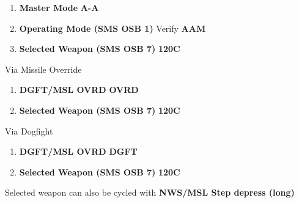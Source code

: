 \begin{tcoloritemize}
    \begin{enumerate}
        \item \textbf{Master Mode} \dotfill \textbf{A-A}
        \item \textbf{Operating Mode (SMS OSB 1)} \dotfill Verify \textbf{AAM}
        \item \textbf{Selected Weapon (SMS OSB 7)} \dotfill \textbf{120C}
    \end{enumerate}

    Via Missile Override

    \begin{enumerate}
        \item \textbf{DGFT/MSL OVRD} \dotfill \textbf{OVRD}
        \item \textbf{Selected Weapon (SMS OSB 7)} \dotfill \textbf{120C} 
    \end{enumerate}
    
    Via Dogfight

    \begin{enumerate}
        \item \textbf{DGFT/MSL OVRD} \dotfill \textbf{DGFT}
        \item \textbf{Selected Weapon (SMS OSB 7)} \dotfill \textbf{120C}
    \end{enumerate}
    
    Selected weapon can also be cycled with \textbf{NWS/MSL Step depress (long)}
\end{tcoloritemize}


